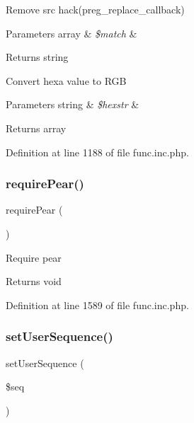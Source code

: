 Remove src hack(preg\+\_\+replace\+\_\+callback)


\begin{DoxyParams}[1]{Parameters}
array & {\em \$match} & \\
\hline
\end{DoxyParams}
\begin{DoxyReturn}{Returns}
string 
\end{DoxyReturn}
Convert hexa value to R\+GB


\begin{DoxyParams}[1]{Parameters}
string & {\em \$hexstr} & \\
\hline
\end{DoxyParams}
\begin{DoxyReturn}{Returns}
array
\end{DoxyReturn}


Definition at line 1188 of file func.\+inc.\+php.

\hypertarget{func_8inc_8php_ad09c8e07e96c499b4b71d54c2950e704}{}\label{func_8inc_8php_ad09c8e07e96c499b4b71d54c2950e704} 
\subsubsection{\texorpdfstring{require\+Pear()}{requirePear()}}
{\footnotesize\ttfamily require\+Pear (\begin{DoxyParamCaption}{ }\end{DoxyParamCaption})}

Require pear

\begin{DoxyReturn}{Returns}
void 
\end{DoxyReturn}


Definition at line 1589 of file func.\+inc.\+php.

\hypertarget{func_8inc_8php_aa3832c4893dae39987cf056c24c29392}{}\label{func_8inc_8php_aa3832c4893dae39987cf056c24c29392} 
\subsubsection{\texorpdfstring{set\+User\+Sequence()}{setUserSequence()}}
{\footnotesize\ttfamily set\+User\+Sequence (\begin{DoxyParamCaption}\item[{}]{\$seq }\end{DoxyParamCaption})}

